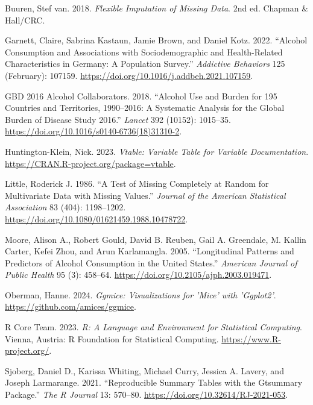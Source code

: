\documentclass[
]{article}
\newlength{\cslhangindent}
\newlength{\cslentryspacingunit} %
\newenvironment{CSLReferences}[2] %
 {%
  \setlength{\parindent}{0pt}
  \ifodd #1
  \let\oldpar\par
  \def\par{\hangindent=\cslhangindent\oldpar}
  \fi
  \setlength{\parskip}{#2\cslentryspacingunit}
 }%
 {}
\begin{document}
\hypertarget{refs}{}
\begin{CSLReferences}{1}{0}
\leavevmode{}%
Buuren, Stef van. 2018. \emph{Flexible Imputation of Missing Data}. 2nd ed. Chapman \& Hall/CRC.

\leavevmode{}%
Garnett, Claire, Sabrina Kastaun, Jamie Brown, and Daniel Kotz. 2022. {``Alcohol Consumption and Associations with Sociodemographic and Health-Related Characteristics in Germany: A Population Survey.''} \emph{Addictive Behaviors} 125 (February): 107159. \url{https://doi.org/10.1016/j.addbeh.2021.107159}.

\leavevmode{}%
GBD 2016 Alcohol Collaborators. 2018. {``Alcohol Use and Burden for 195 Countries and Territories, 1990--2016: A Systematic Analysis for the Global Burden of Disease Study 2016.''} \emph{Lancet} 392 (10152): 1015--35. \url{https://doi.org/10.1016/s0140-6736(18)31310-2}.

\leavevmode{}%
Huntington-Klein, Nick. 2023. \emph{Vtable: Variable Table for Variable Documentation}. \url{https://CRAN.R-project.org/package=vtable}.

\leavevmode{}%
Little, Roderick J. 1986. {``A Test of Missing Completely at Random for Multivariate Data with Missing Values.''} \emph{Journal of the American Statistical Association} 83 (404): 1198--1202. \url{https://doi.org/10.1080/01621459.1988.10478722}.

\leavevmode{}%
Moore, Alison A., Robert Gould, David B. Reuben, Gail A. Greendale, M. Kallin Carter, Kefei Zhou, and Arun Karlamangla. 2005. {``Longitudinal Patterns and Predictors of Alcohol Consumption in the United States.''} \emph{American Journal of Public Health} 95 (3): 458--64. \url{https://doi.org/10.2105/ajph.2003.019471}.

\leavevmode{}%
Oberman, Hanne. 2024. \emph{Ggmice: Visualizations for 'Mice' with 'Ggplot2'}. \url{https://github.com/amices/ggmice}.

\leavevmode{}%
R Core Team. 2023. \emph{R: A Language and Environment for Statistical Computing}. Vienna, Austria: R Foundation for Statistical Computing. \url{https://www.R-project.org/}.

\leavevmode{}%
Sjoberg, Daniel D., Karissa Whiting, Michael Curry, Jessica A. Lavery, and Joseph Larmarange. 2021. {``Reproducible Summary Tables with the Gtsummary Package.''} \emph{{The R Journal}} 13: 570--80. \url{https://doi.org/10.32614/RJ-2021-053}.


\end{CSLReferences}
\end{document}
